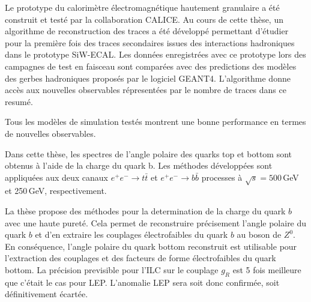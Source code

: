 Le prototype du calorim\`etre \'electromagn\'etique hautement granulaire a été construit et testé par la collaboration CALICE.
Au cours de cette thèse, un algorithme de reconstruction des traces a été développé permettant d'étudier pour la première fois des traces secondaires issues des interactions hadroniques dans le prototype SiW-ECAL.
Les données enregistrées avec ce prototype lors des campagnes de test en faisceau sont comparées avec des predictions des modèles des gerbes hadroniques proposés par le logiciel GEANT4. L'algorithme donne accès aux nouvelles observables répresentées par le nombre de traces dans ce resumé. 


Tous les modèles de simulation testés montrent une bonne performance en termes de nouvelles observables.

Dans cette thèse, les spectres de l'angle polaire des quarks top et bottom sont obtenus à l'aide de la charge du quark b.  
Les méthodes développées sont appliquées aux deux canaux $e^+ e^- \to t\bar{t}$ et $e^+ e^- \to b\bar{b}$ processes à $\sqrt {s} = 500$\,GeV et 250\,GeV, respectivement.

La thèse propose des méthodes pour la determination de la charge du quark $b$ avec une haute pureté. Cela permet de reconstruire précisement l'angle polaire du quark $b$ et d'en extraire les couplages électrofaibles du quark $b$ au boson de $Z^0$.%
En conséquence, l'angle polaire du quark bottom reconstruit est utilisable pour l'extraction des couplages  et des facteurs de forme électrofaibles du quark bottom.
La précision previsible pour l'ILC sur le couplage $g_R$ est 5 fois meilleure que c'\'etait le cas pour LEP. L'anomalie LEP sera soit donc confirmée, soit définitivement écartée.


